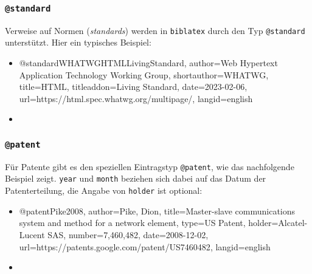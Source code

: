 
\subsubsection{\texttt{\bfseries @standard}}
\label{sec:@standard}

Verweise auf Normen (\emph{standards}) werden in \texttt{biblatex} durch den
Typ \texttt{@standard} unterstützt. Hier ein typisches Beispiel:
%
\begin{itemize}
\item[]
\begin{GenericCode}[numbers=none]
@standard{WHATWGHTMLLivingStandard,
  author={{Web Hypertext Application Technology Working Group}},
  shortauthor={WHATWG},
  title={HTML},
  titleaddon={Living Standard},
  date={2023-02-06},
  url={https://html.spec.whatwg.org/multipage/},
  langid={english}
}
\end{GenericCode}
\item[\cite{WHATWGHTMLLivingStandard}] 
\end{itemize}
%


\subsubsection{\texttt{\bfseries @patent}}
\label{sec:@patent}

Für Patente gibt es den speziellen Eintragstyp \texttt{@patent}, wie das
nachfolgende Beispiel zeigt. \texttt{year} und \texttt{month} beziehen sich
dabei auf das Datum der Patenterteilung, die Angabe von \texttt{holder} ist
optional:
%
\begin{itemize}
\item[]
\begin{GenericCode}[numbers=none]
@patent{Pike2008,
  author={Pike, Dion},
  title={Master-slave communications system and method for a network element},
  type={US Patent},
  holder={Alcatel-Lucent SAS},
  number={7,460,482},
  date={2008-12-02},
  url={https://patents.google.com/patent/US7460482},
  langid={english}
}
\end{GenericCode}
\item[\cite{Pike2008}] 
\end{itemize}
%


